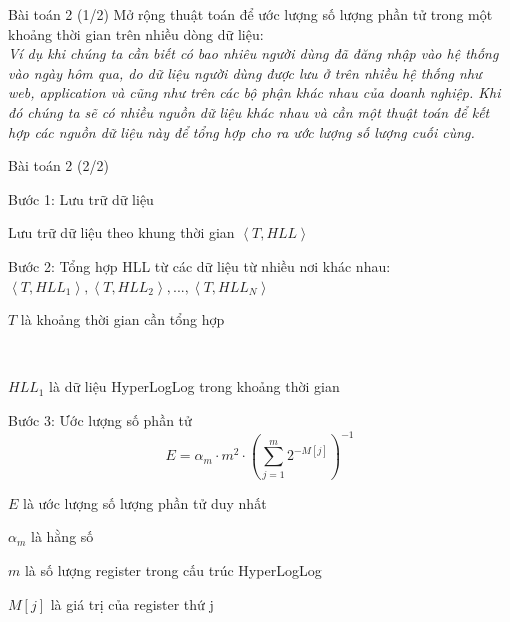 \documentclass[10pt]{beamer}
\newcommand{\SubItem}[1]{
    {\setlength\itemindent{15pt} \item[-] #1}
}
\begin{document}
\begin{frame}[fragile]{Bài toán 2 (1/2)}
  Mở rộng thuật toán để ước lượng số lượng phần tử trong một khoảng thời gian trên nhiều dòng dữ liệu:\\
\vspace{0.1cm}
  \textit{ Ví dụ khi chúng ta cần biết có bao nhiêu người dùng đã đăng nhập vào hệ thống vào ngày hôm qua, do dữ liệu người dùng được lưu ở trên nhiều hệ thống như web, application và cũng như trên các bộ phận khác nhau của doanh nghiệp. Khi đó chúng ta sẽ có nhiều nguồn dữ liệu khác nhau và cần một thuật toán để kết hợp các nguồn dữ liệu này để tổng hợp cho ra ước lượng
  số lượng cuối cùng.}
\end{frame}
\begin{frame}[fragile]{Bài toán 2 (2/2)}
  \begin{itemize}
      \item Bước 1: Lưu trữ dữ liệu
      \SubItem{Lưu trữ dữ liệu theo khung thời gian $\left< T, HLL\right>$}
      \item Bước 2: Tổng hợp HLL từ các dữ liệu từ nhiều nơi khác nhau:\\
      $\left< T, HLL_1\right>, \left< T, HLL_2\right>,...,\left< T, HLL_N\right>$\\
      \SubItem{$T$ là khoảng thời gian cần tổng hợp} \\
      \SubItem{$HLL_1$ là dữ liệu HyperLogLog trong khoảng thời gian}
      \item Bước 3: Ước lượng số phần tử
      \[E = \alpha_m \cdot m^2 \cdot \left( \sum_{j=1}^{m} 2^{-M[j]} \right)^{-1}\]
      \SubItem{$E$ là ước lượng số lượng phần tử duy nhất}
      \SubItem{$\alpha_m$ là hằng số}
      \SubItem{$m$ là số lượng register trong cấu trúc HyperLogLog}
      \SubItem{$M[j]$ là giá trị của register thứ j}
\end{itemize}
\end{frame}
\end{document}
